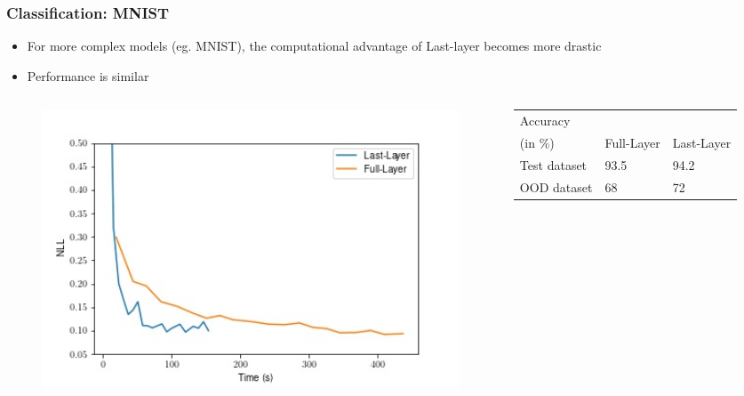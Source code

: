 \documentclass{beamer}
\begin{document}
        \begin{frame}
            \frametitle{Classification: MNIST}
            \begin{itemize}
                \item For more complex models (eg. MNIST), the computational advantage of Last-layer becomes more drastic
                \item Performance is similar
            \end{itemize}
            \begin{columns}
                \begin{column}{0.5\textwidth}
                    \begin{figure}
                        \includegraphics[width=1.1\textwidth]{images/Classification/LLvsFull.jpg}
                    \end{figure}                  
                \end{column}
                \begin{column}{0.5\textwidth}                
                    \begin{tabular}{p{}|p{}|p{}}
                        Accuracy\\ (in \%)&Full-Layer & Last-Layer\\
                        \hline
                        Test dataset & 93.5 & 94.2\\
                        OOD dataset & 68 & 72
                    \end{tabular}
                \end{column}
            \end{columns}
        \end{frame}
\end{document}
